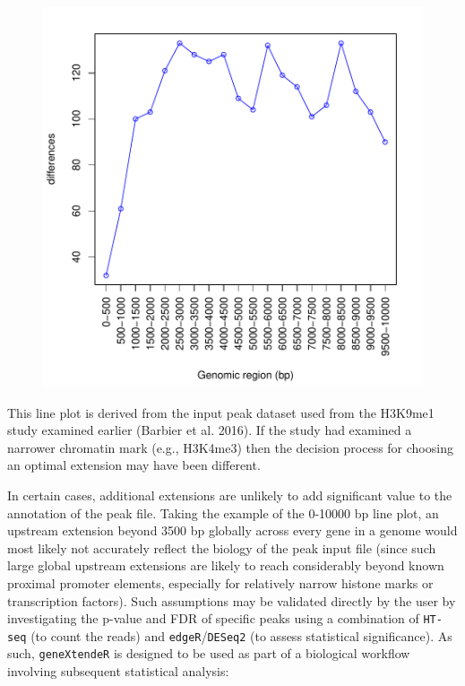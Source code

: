 \documentclass[12pt]{article}
\begin{document}
\begin{figure}[H]
\begin{center}
\includegraphics{geneXtendeR-038}
\end{center}
\end{figure}

This line plot is derived from the input peak dataset used from the H3K9me1 study examined earlier (Barbier et al. 2016).  If the study had examined a narrower chromatin mark (e.g., H3K4me3) then the decision process for choosing an optimal extension may have been different.  

In certain cases, additional extensions are unlikely to add significant value to the annotation of the peak file.  Taking the example of the 0-10000 bp line plot, an upstream extension beyond 3500 bp globally across every gene in a genome would most likely not accurately reflect the biology of the peak input file (since such large global upstream extensions are likely to reach considerably beyond known proximal promoter elements, especially for relatively narrow histone marks or transcription factors).  Such assumptions may be validated directly by the user by investigating the p-value and FDR of specific peaks using a combination of \texttt{HT-seq} (to count the reads) and \texttt{edgeR}/\texttt{DESeq2} (to assess statistical significance).  As such, \texttt{geneXtendeR} is designed to be used as part of a biological workflow involving subsequent statistical analysis:
\end{document}
